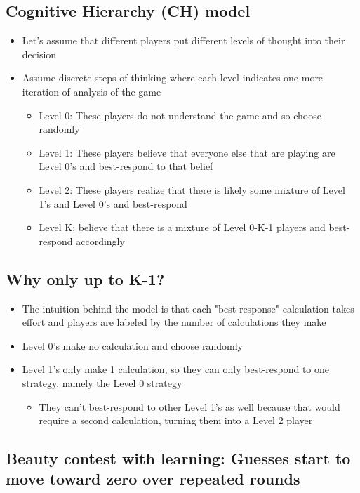\subsection{Cognitive Hierarchy (CH) model}
\begin{itemize}
    \item Let's assume that different players put different levels of thought into their decision
    \item Assume discrete steps of thinking where each level indicates one more iteration of analysis of the game
    \begin{itemize}
        \item Level 0: These players do not understand the game and so choose randomly
        \item Level 1: These players believe that everyone else that are playing are Level 0's and best-respond to that belief
        \item Level 2: These players realize that there is likely some mixture of Level 1's and Level 0's and best-respond
\item  Level K: believe that there is a mixture of Level 0-K-1 players and best-respond accordingly

    \end{itemize}
\end{itemize}

\subsection{Why only up to K-1?}
\begin{itemize}
    \item The intuition behind the model is that each "best response" calculation takes effort and players are labeled by the number of calculations they make
    \item Level 0's make no calculation and choose randomly
    \item Level 1's only make 1 calculation, so they can only best-respond to one strategy, namely the Level 0 strategy
    \begin{itemize}
        \item They can't best-respond to other Level 1's as well because that would require a second calculation, turning them into a Level 2 player
    \end{itemize}
\end{itemize}

\subsection{Beauty contest with learning: Guesses start to move toward zero over repeated rounds}
